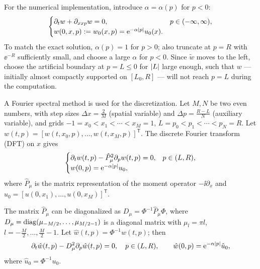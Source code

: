 For the numerical implementation, introduce $\alpha = \alpha(p)$ for $p < 0$:
\begin{equation}
  \begin{cases}
    \partial_t w + \partial_{xxp} w = 0, & p \in (-\infty, \infty), \\
    w(0, x, p) := w_0(x, p) = \mathrm{e}^{-\alpha\left\lvert p \right\rvert} u_0(x). &
  \end{cases}
\end{equation}
To match the exact solution, $\alpha(p) = 1$ for $p > 0$; also truncate at
$p = R$ with $\ee^{-R}$ sufficiently small, and choose a large $\alpha$ for
$p < 0$. Since $\tilde{w}$ moves to the left, choose the artificial boundary at
$p = L \le 0$ for $\left\lvert L \right\rvert$ large enough, such that $w$ --- initially almost
compactly supported on $[L_0, R]$ --- will not reach $p = L$ during the
computation.

A Fourier spectral method is used for the discretization. Let $M, N$ be two even
numbers, with step sizes $\Delta x = \tfrac{2}{M}$ (spatial variable) and
$\Delta p = \tfrac{R - L}{N}$ (auxiliary variable), and grids
$-1 = x_0 < x_1 < \cdots < x_M = 1$, $L = p_0 < p_1 < \cdots < p_N = R$. Let
$w(t, p) = [w(t, x_0, p), \dots, w(t, x_M, p)]^{\mathsf{T}}$. The discrete Fourier
transform (DFT) on $x$ gives
\begin{equation}
  \begin{cases}
    \partial_t w(t, p) - \hat{P}_\mu^2 \partial_p w(t, p) = 0, & p \in (L, R), \\
    w(0, p) = \mathrm{e}^{-\alpha\left\lvert p \right\rvert} u_0, &
  \end{cases}
\end{equation}
where $\hat{P}_\mu$ is the matrix representation of the moment operator
$-\ii\partial_x$ and $u_0 = [u(0, x_1), \dots, u(0, x_M)]^{\mathsf{T}}$.

The matrix $\hat{P}_\mu$ can be diagonalized as
$D_\mu = \Phi^{-1}\hat{P}_\mu\Phi$, where
$D_\mu = \operatorname{diag}(\mu_{-M/2}, \dots, \mu_{M/2-1})$ is a diagonal matrix with
$\mu_l = \pi l$, $l = -\tfrac{M}{2}, \dots, \tfrac{M}{2} - 1$. Let
$\hat{w}(t, p) = \Phi^{-1} w(t, p)$; then
\begin{equation}
  \partial_t \hat{w}(t, p) - D_\mu^2 \partial_p \hat{w}(t, p) = 0, \quad p \in (L, R),
  \qquad \hat{w}(0, p) = \mathrm{e}^{-\alpha\left\lvert p \right\rvert}\hat{u}_0,
\end{equation}
where $\hat{u}_0 = \Phi^{-1} u_0$.

